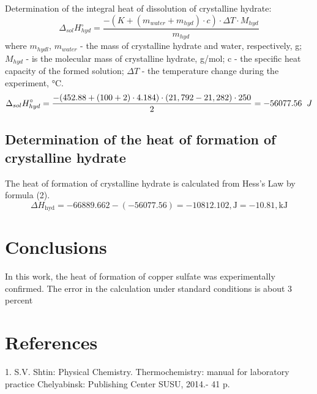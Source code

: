 \documentclass[12pt, letterpaper]{article}
\begin{document}
        Determination of the integral heat of dissolution of crystalline hydrate:
         \begin{equation}
            \Delta_{sol}H^\circ_{hyd} = \frac{-(K + (m_{water} + m_{hyd}) \cdot c) \cdot \Delta T \cdot M_{hyd}}{m_{hyd}}
        \end{equation}
         where $ m_{hydl}$, $m_{water}$ - the mass of crystalline hydrate  and water, respectively, g; $M_{hyd}$ - is the molecular mass of crystalline hydrate, g/mol; c - the specific heat capacity of the formed solution; $\Delta T$ - the temperature change during the experiment, °C. \\

          \begin{equation}
            \Delta_{sol}H^\circ_{hyd} = \frac{-(452.88 + (100 + 2) \cdot 4.184) \cdot (21,792 - 21,282) \cdot 250}{2} =-56077.56 \hspace{2 mm} J
        \end{equation}
        
         \subsection*{Determination of the heat of formation of crystalline hydrate}
         \hspace{4mm} The heat of formation of crystalline hydrate is calculated from Hess's Law by formula (2).
         \begin{equation}
             \Delta H_{\text{hyd}} = -66889.662 - (-56077.56) = -10812.102 , \text{J} = -10.81 , \text{kJ} 
        \end{equation}

    \section*{Conclusions}
         In this work, the heat of formation of copper sulfate was experimentally confirmed. The error in the calculation under standard conditions is about 3 percent
    \newpage

    \section*{References}
        1. S.V. Shtin: Physical Chemistry. Thermochemistry: manual for laboratory practice Chelyabinsk: Publishing Center SUSU, 2014.- 41 p.
\end{document}
